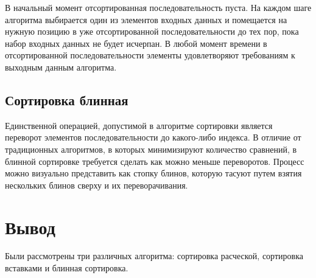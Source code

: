 В начальный момент отсортированная последовательность пуста.
На каждом шаге алгоритма выбирается один из элементов входных данных и помещается на нужную позицию в уже отсортированной последовательности до тех пор, пока набор входных данных не будет исчерпан.
В любой момент времени в отсортированной последовательности элементы удовлетворяют требованиям к выходным данным алгоритма.

\subsection{Сортировка блинная}
Единственной операцией, допустимой в алгоритме сортировки является переворот элементов последовательности до какого-либо индекса.
В отличие от традиционных алгоритмов, в которых минимизируют количество сравнений, в блинной сортировке требуется сделать как можно меньше переворотов.
Процесс можно визуально представить как стопку блинов, которую тасуют путем взятия нескольких блинов сверху и их переворачивания.

\section*{Вывод}
Были рассмотрены три различных алгоритма: сортировка расческой, сортировка вставками и блинная сортировка.
